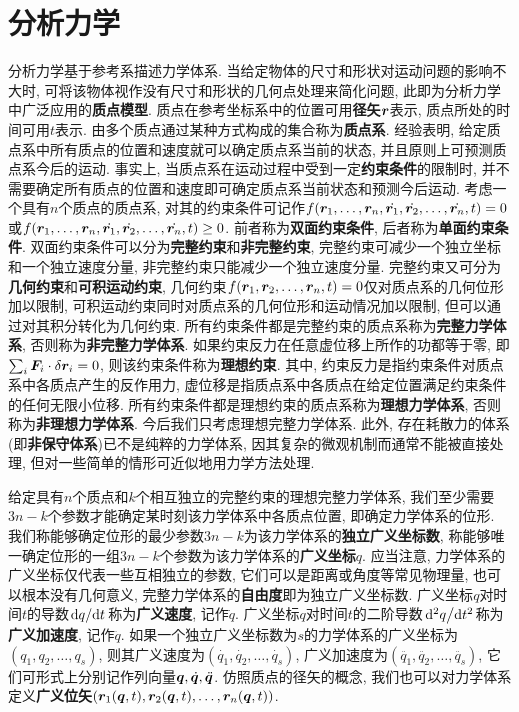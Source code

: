 \section[分析力学]{分析力学}\label{分析力学}
分析力学基于参考系描述力学体系. 当给定物体的尺寸和形状对运动问题的影响不大时, 可将该物体视作没有尺寸和形状的几何点处理来简化问题, 此即为分析力学中广泛应用的\textbf{质点模型}. 质点在参考坐标系中的位置可用\textbf{径矢}$ \vb*{r} $表示, 质点所处的时间可用$ t $表示. 由多个质点通过某种方式构成的集合称为\textbf{质点系}. 经验表明, 给定质点系中所有质点的位置和速度就可以确定质点系当前的状态, 并且原则上可预测质点系今后的运动. 事实上, 当质点系在运动过程中受到一定\textbf{约束条件}的限制时, 并不需要确定所有质点的位置和速度即可确定质点系当前状态和预测今后运动. 考虑一个具有$ n $个质点的质点系, 对其的约束条件可记作$ f(\vb*{r}_1,\ldots,\vb*{r}_n,\dot{\vb*{r}_1},\dot{\vb*{r}_2},\ldots,\dot{\vb*{r}_n},t)=0 $或$ f(\vb*{r}_1,\ldots,\vb*{r}_n,\dot{\vb*{r}_1},\dot{\vb*{r}_2},\ldots,\dot{\vb*{r}_n},t) \geq 0 $. 前者称为\textbf{双面约束条件}, 后者称为\textbf{单面约束条件}. 双面约束条件可以分为\textbf{完整约束}和\textbf{非完整约束}, 完整约束可减少一个独立坐标和一个独立速度分量, 非完整约束只能减少一个独立速度分量. 完整约束又可分为\textbf{几何约束}和\textbf{可积运动约束}, 几何约束$ f(\vb*{r}_1,\vb*{r}_2,\ldots,\vb*{r}_n,t)=0 $仅对质点系的几何位形加以限制, 可积运动约束同时对质点系的几何位形和运动情况加以限制, 但可以通过对其积分转化为几何约束. 所有约束条件都是完整约束的质点系称为\textbf{完整力学体系}, 否则称为\textbf{非完整力学体系}. 如果约束反力在任意虚位移上所作的功都等于零, 即$ \sum_i \vb*{F}_i \cdot \var{\vb*{r}_i} = 0 $, 则该约束条件称为\textbf{理想约束}. 其中, 约束反力是指约束条件对质点系中各质点产生的反作用力, 虚位移是指质点系中各质点在给定位置满足约束条件的任何无限小位移. 所有约束条件都是理想约束的质点系称为\textbf{理想力学体系}, 否则称为\textbf{非理想力学体系}. 今后我们只考虑理想完整力学体系. 此外, 存在耗散力的体系(即\textbf{非保守体系})已不是纯粹的力学体系, 因其复杂的微观机制而通常不能被直接处理, 但对一些简单的情形可近似地用力学方法处理.

给定具有$ n $个质点和$ k $个相互独立的完整约束的理想完整力学体系, 我们至少需要$ 3n-k $个参数才能确定某时刻该力学体系中各质点位置, 即确定力学体系的位形. 我们称能够确定位形的最少参数$ 3n-k $为该力学体系的\textbf{独立广义坐标数}, 称能够唯一确定位形的一组$ 3n-k $个参数为该力学体系的\textbf{广义坐标}$ q $. 应当注意, 力学体系的广义坐标仅代表一些互相独立的参数, 它们可以是距离或角度等常见物理量, 也可以根本没有几何意义, 完整力学体系的\textbf{自由度}即为独立广义坐标数. 广义坐标$ q $对时间$ t $的导数$ \dv*{q}{t} $称为\textbf{广义速度}, 记作$ \dot{q} $. 广义坐标$ q $对时间$ t $的二阶导数$ \dv*[2]{q}{t} $称为\textbf{广义加速度}, 记作$ \ddot{q} $. 如果一个独立广义坐标数为$ s $的力学体系的广义坐标为$ (q_1,q_2,\ldots,q_s) $, 则其广义速度为$ (\dot{q_1},\dot{q_2},\ldots,\dot{q_s}) $, 广义加速度为$ (\ddot{q_1},\ddot{q_2},\ldots,\ddot{q_s}) $, 它们可形式上分别记作列向量$ \vb*{q},\dot{\vb*{q}},\ddot{\vb*{q}} $. 仿照质点的径矢的概念, 我们也可以对力学体系定义\textbf{广义位矢}$ (\vb*{r}_1(\vb*{q},t),\vb*{r}_2(\vb*{q},t),\ldots,\vb*{r}_n(\vb*{q},t)) $.

